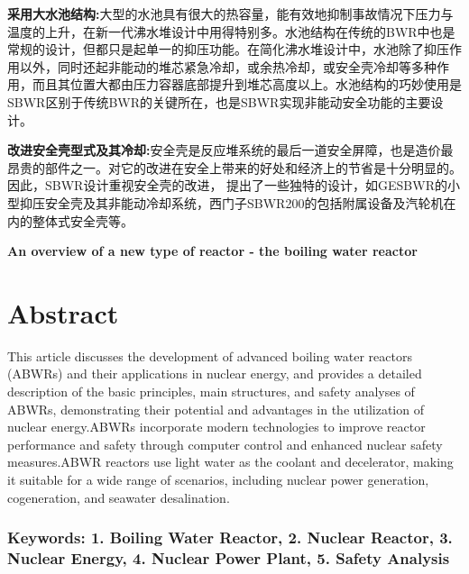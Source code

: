 \documentclass{article}
\begin{document}
\textbf{采用大水池结构:}大型的水池具有很大的热容量，能有效地抑制事故情况下压力与温度的上升，在新一代沸水堆设计中用得特别多。水池结构在传统的BWR中也是常规的设计，但都只是起单一的抑压功能。在简化沸水堆设计中，水池除了抑压作用以外，同时还起非能动的堆芯紧急冷却，或余热冷却，或安全壳冷却等多种作用，而且其位置大都由压力容器底部提升到堆芯高度以上。水池结构的巧妙使用是SBWR区别于传统BWR的关键所在，也是SBWR实现非能动安全功能的主要设计。

\textbf{改进安全壳型式及其冷却:}安全壳是反应堆系统的最后一道安全屏障，也是造价最昂贵的部件之一。对它的改进在安全上带来的好处和经济上的节省是十分明显的。因此，SBWR设计重视安全壳的改进， 提出了一些独特的设计，如GESBWR的小型抑压安全壳及其非能动冷却系统，西门子SBWR200的包括附属设备及汽轮机在内的整体式安全壳等。\cite{YanYuHuaXinYiDaiJianHuaFeiShuiDuiHeDianZhanFaZhanGaiKuangJiQiTeDian1997}



\vspace{3em}

{
\centering\textbf{\huge An overview of a new type of reactor - the boiling water reactor} \\
}

\section*{Abstract}

This article discusses the development of advanced boiling water reactors (ABWRs) and their applications in nuclear energy, and provides a detailed description of the basic principles, main structures, and safety analyses of ABWRs, demonstrating their potential and advantages in the utilization of nuclear energy.ABWRs incorporate modern technologies to improve reactor performance and safety through computer control and enhanced nuclear safety measures.ABWR reactors use light water as the coolant and decelerator, making it suitable for a wide range of scenarios, including nuclear power generation, cogeneration, and seawater desalination.

\subsubsection*{Keywords: 1. Boiling Water Reactor, 2. Nuclear Reactor, 3. Nuclear Energy, 4. Nuclear Power Plant, 5. Safety Analysis}
\end{document}
